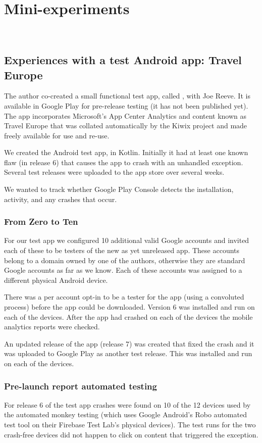 \chapter{Mini-experiments}~\label{appendix-mini-experiments}

\section{Experiences with a test Android app: Travel Europe}
The author co-created a small functional test app, called , with Joe Reeve. It is available in Google Play for pre-release testing (it has not been published yet). The app incorporates Microsoft's App Center Analytics and content known as Travel Europe that was collated automatically by the Kiwix project and made freely available for use and re-use.

We created the Android test app, in Kotlin. Initially it had at least one known flaw (in release 6) that causes the app to crash with an unhandled exception. Several test releases were uploaded to the app store over several weeks.

We wanted to track whether Google Play Console detects the installation, activity, and any crashes that occur.

\subsection{From Zero to Ten}
For our test app we configured 10 additional valid Google accounts and invited each of these to be testers of the new as yet unreleased app. These accounts belong to a domain owned by one of the authors, otherwise they are standard Google accounts as far as we know. Each of these accounts was assigned to a different physical Android device.

There was a per account opt-in to be a tester for the app (using a convoluted process) before the app could be downloaded. Version 6 was installed and run on each of the devices. After the app had crashed on each of the devices the mobile analytics reports were checked.

An updated release of the app (release 7) was created that fixed the crash and it was uploaded to Google Play as another test release. This was installed and run on each of the devices.

\subsection{Pre-launch report automated testing}
For release 6 of the test app crashes were found on 10 of the 12 devices used by the automated monkey testing (which uses Google Android's Robo automated test tool on their Firebase Test Lab's physical devices). The test runs for the two crash-free devices did not happen to click on content that triggered the exception.

